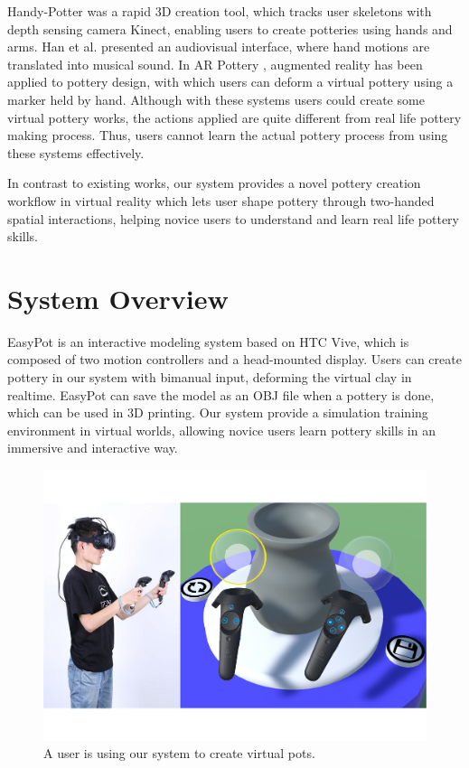 \documentclass{svjour3}                     %
\begin{document}
Handy-Potter \cite{murugappan2013handy} was a rapid 3D creation tool, which tracks user skeletons with depth sensing camera Kinect, enabling users to create potteries using hands and arms.
Han et al. \cite{han2014virtual} presented an audiovisual interface, where hand motions are translated into musical sound.
In AR Pottery \cite{han2007ar}, augmented reality has been applied to pottery design, with which users can deform a virtual pottery using a marker held by hand.
Although with these systems users could create some virtual pottery works, the actions applied are quite different from real life pottery making process. Thus, users cannot learn the actual pottery process from using these systems effectively.

In contrast to existing works, our system provides a novel pottery creation workflow in virtual reality which lets user shape pottery through two-handed spatial interactions, helping novice users to understand and learn real life pottery skills.




\section{System Overview}
\label{sec:3}
EasyPot is an interactive modeling system based on HTC Vive, which is composed of two motion controllers and a head-mounted display. 
Users can create pottery in our system with bimanual input, deforming the virtual clay in realtime.
EasyPot can save the model as an OBJ file when a pottery is done, which can be used in 3D printing.
Our system provide a simulation training environment in virtual worlds, allowing novice users learn pottery skills in an immersive and interactive way.

\begin{figure}
\includegraphics[width=\textwidth]{results}
\caption{A user is using our system to create virtual pots.}
\label{fig:results}
\end{figure}
\end{document}
